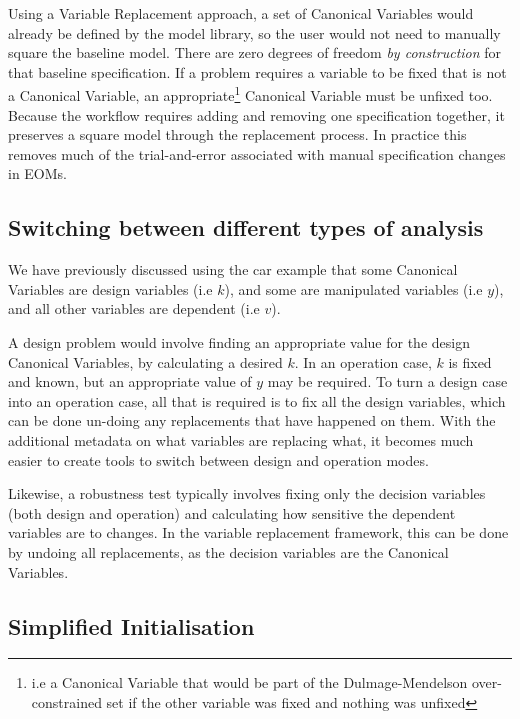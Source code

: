 Using a Variable Replacement approach, a set of Canonical Variables would
already be defined by the model library, so the user would not need to
manually square the baseline model. There are zero degrees of freedom
\emph{by construction} for that baseline specification. If a problem
requires a variable to be fixed that is not a Canonical Variable, an
appropriate\footnote{i.e a Canonical Variable that would be part of the
  Dulmage-Mendelson over-constrained set if the other variable was
  fixed and nothing was unfixed} Canonical Variable must be unfixed too.
Because the workflow requires adding and removing one specification
together, it preserves a square model through the replacement process.
In practice this removes much of the trial-and-error associated with
manual specification changes in EOMs.

\hypertarget{switching-between-different-types-of-analysis}{%
\subsection{Switching between different types of
analysis}\label{switching-between-different-types-of-analysis}}

We have previously discussed using the car example that some
Canonical Variables are design variables (i.e \(k\)), and some are
manipulated variables (i.e \(y\)), and all other variables are dependent
(i.e \(v\)).

A design problem would involve finding an appropriate value for the design
Canonical Variables, by calculating a desired \(k\). In an operation case,
\(k\) is fixed and known, but an appropriate value of \(y\) may be
required. To turn a design case into an operation case, all that is
required is to fix all the design variables, which can be done un-doing
any replacements that have happened on them. With the additional
metadata on what variables are replacing what, it becomes much easier to
create tools to switch between design and operation modes.

Likewise, a robustness test typically involves fixing only the decision
variables (both design and operation) and calculating how sensitive the
dependent variables are to changes. In the variable replacement
framework, this can be done by undoing all replacements, as the
decision variables are the Canonical Variables.

\hypertarget{simplified-initialisation}{%
\subsection{\texorpdfstring{Simplified Initialisation
}{Simplified Initialisation }}\label{simplified-initialisation}}

